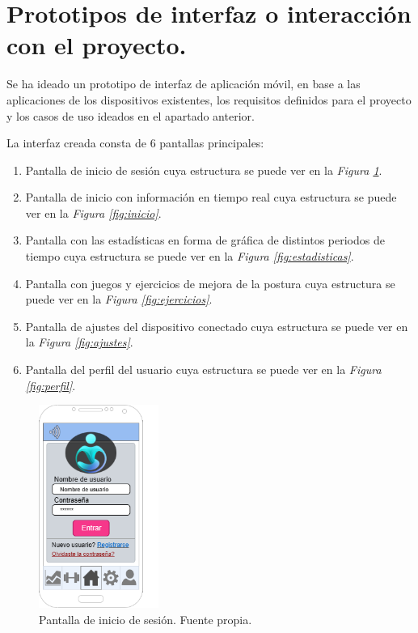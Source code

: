 \clearpage

\section{Prototipos de interfaz o interacción con el proyecto.}

Se ha ideado un prototipo de interfaz de aplicación móvil, en base a las aplicaciones de los dispositivos existentes, los requisitos definidos para el proyecto y los casos de uso ideados en el apartado anterior.

La interfaz creada consta de 6 pantallas principales:
\begin{enumerate}
    \item Pantalla de inicio de sesión cuya estructura se puede ver en la \textit{Figura \ref{fig:inicioSesion}}.
    \item Pantalla de inicio con información en tiempo real cuya estructura se puede ver en la \textit{Figura \ref{fig:inicio}}.
    \item Pantalla con las estadísticas en forma de gráfica de distintos periodos de tiempo cuya estructura se puede ver en la \textit{Figura \ref{fig:estadisticas}}.
    \item Pantalla con juegos y ejercicios de mejora de la postura cuya estructura se puede ver en la \textit{Figura \ref{fig:ejercicios}}.
    \item Pantalla de ajustes del dispositivo conectado cuya estructura se puede ver en la \textit{Figura \ref{fig:ajustes}}.
    \item Pantalla del perfil del usuario cuya estructura se puede ver en la \textit{Figura \ref{fig:perfil}}.
\end{enumerate}


\begin{figure}[h]
    \centering
    \includegraphics[width=0.35\textwidth]{img/InicioSesion.png}
    \caption{Pantalla de inicio de sesión. Fuente propia.}
    \label{fig:inicioSesion} 
\end{figure}

